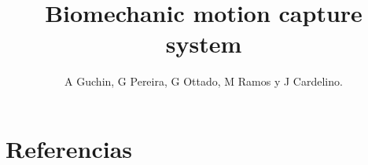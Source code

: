 \documentclass[a4paper]{jpconf}
\begin{document}
\title{Biomechanic motion capture system}

\author{A Guchin, G Pereira, G Ottado, M Ramos y J Cardelino.}

\address{Instituto de Ingenier\'ia El\'ectrica, Facultad de Ingeniería, Universidad de la Rep\'ublica, Uruguay.}












\section*{Referencias}


\end{document}
